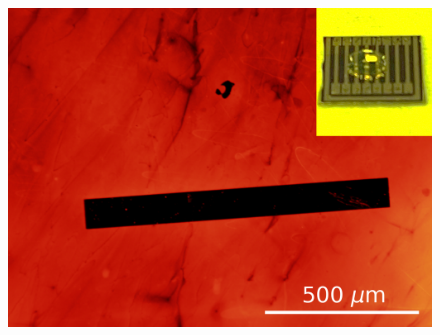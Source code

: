 \documentclass[
  a4paper,
]{scrbook}
\begin{document}
\begin{figure}
\begin{minipage}[t]{0.45\linewidth}
{{\includegraphics{figures/ch6/modified_NGW8D9_edgechannel_post10min50Cacetonerinse_221109.png}

}

}

\end{minipage}%
%
\begin{minipage}[t]{0.01\linewidth}

{\centering 

~

}

\end{minipage}%
%
\begin{minipage}[t]{0.03\linewidth}

{\centering 


}

\end{minipage}%
%
\begin{minipage}[t]{0.01\linewidth}

{\centering 

~

}

\end{minipage}%
%
\begin{minipage}[t]{0.45\linewidth}


\end{minipage}
\end{figure}
\end{document}
